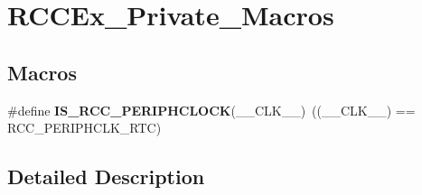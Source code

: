 \hypertarget{group___r_c_c_ex___private___macros}{\section{R\-C\-C\-Ex\-\_\-\-Private\-\_\-\-Macros}
\label{group___r_c_c_ex___private___macros}
}
\subsection*{Macros}
\begin{DoxyCompactItemize}
\item 
\hypertarget{group___r_c_c_ex___private___macros_ga5596deb1fc357d14cd7e22f39db9d21c}{\#define {\bfseries I\-S\-\_\-\-R\-C\-C\-\_\-\-P\-E\-R\-I\-P\-H\-C\-L\-O\-C\-K}(\-\_\-\-\_\-\-C\-L\-K\-\_\-\-\_\-)~((\-\_\-\-\_\-\-C\-L\-K\-\_\-\-\_\-) == R\-C\-C\-\_\-\-P\-E\-R\-I\-P\-H\-C\-L\-K\-\_\-\-R\-T\-C)}\label{group___r_c_c_ex___private___macros_ga5596deb1fc357d14cd7e22f39db9d21c}

\end{DoxyCompactItemize}


\subsection{Detailed Description}

